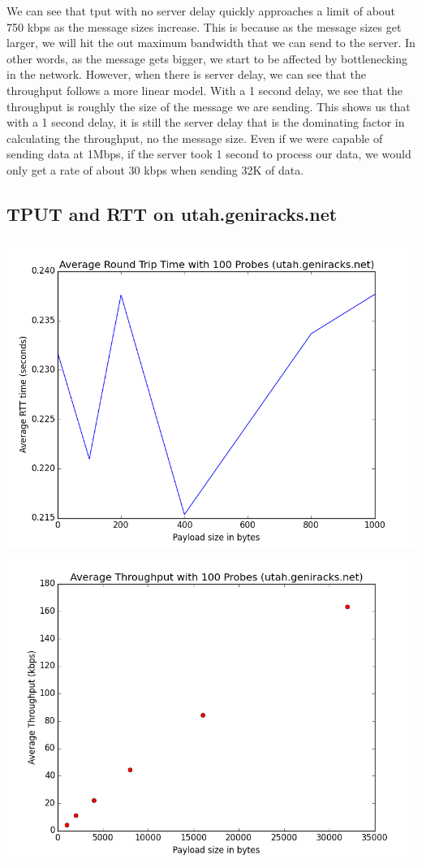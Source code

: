 \documentclass[11pt]{article}
\theoremstyle{definition}
\begin{document}
We can see that tput with no server delay quickly approaches a limit of about 750 kbps as the message sizes increase.  This is because as the message sizes get larger, we will hit the out maximum bandwidth that we can send to the server.  In other words, as the message gets bigger, we start to be affected by bottlenecking in the network.  However, when there is server delay, we can see that the throughput follows a more linear model.  With a 1 second delay, we see that the throughput is roughly the size of the message we are sending.  This shows us that with a 1 second delay, it is still the server delay that is the dominating factor in calculating the throughput, no the message size.  Even if we were capable of sending data at 1Mbps, if the server took 1 second to process our data, we would only get a rate of about 30 kbps when sending 32K of data.

\subsection*{TPUT and RTT on utah.geniracks.net}
\includegraphics[scale=0.4]{rtt_utah}
\includegraphics[scale=0.4]{tput_utah}
\end{document}
